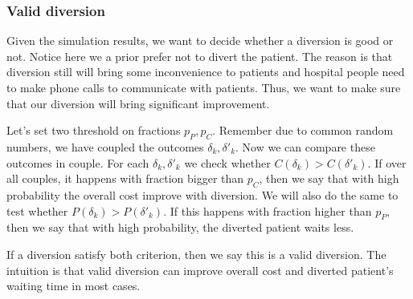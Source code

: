 \subsubsection{Valid diversion}

Given the simulation results, we want to decide whether a diversion is good or not. Notice here we a prior prefer not to divert the patient. The reason is that diversion still will bring some inconvenience to patients and hospital people need to make phone calls to communicate with patients. Thus, we want to make sure that our diversion will bring significant improvement.

Let's set two threshold on fractions $p_P, p_C$. Remember due to common random numbers, we have coupled the outcomes $\delta_k, \delta'_k$. Now we can compare these outcomes in couple. For each $\delta_k, \delta'_k$ we check whether $C(\delta_k) > C(\delta'_k)$. If over all couples, it happens with fraction bigger than $p_C$, then we say that with high probability the overall cost improve with diversion. We will also do the same to test whether $P(\delta_k) > P(\delta'_k)$. If this happens with fraction higher than $p_P$, then we say that with high probability, the diverted patient waits less.

If a diversion satisfy both criterion, then we say this is a valid diversion. The intuition is that valid diversion can improve overall cost and diverted patient's waiting time in most cases.